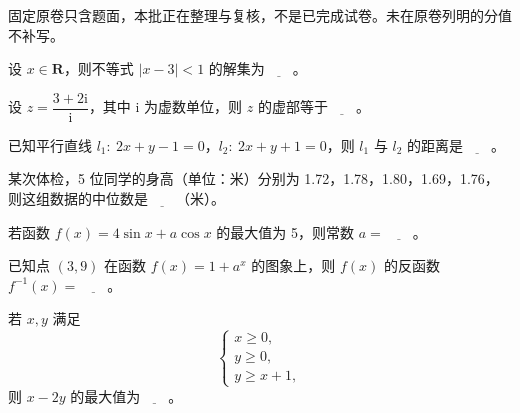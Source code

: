 

\begin{gktip}
固定原卷只含题面，本批正在整理与复核，不是已完成试卷。未在原卷列明的分值不补写。
\end{gktip}


\begin{question}
设 \(x\in\mathbf R\)，则不等式 \(|x-3|<1\) 的解集为\(\underline{\qquad}\)。

\end{question}
\begin{question}
设 \(z=\dfrac{3+2\mathrm i}{\mathrm i}\)，其中 \(\mathrm i\) 为虚数单位，则 \(z\) 的虚部等于\(\underline{\qquad}\)。

\end{question}
\begin{question}
已知平行直线 \(l_1:\ 2x+y-1=0\)，\(l_2:\ 2x+y+1=0\)，则 \(l_1\) 与 \(l_2\) 的距离是\(\underline{\qquad}\)。

\end{question}
\begin{question}
某次体检，5 位同学的身高（单位：米）分别为 1.72，1.78，1.80，1.69，1.76，则这组数据的中位数是\(\underline{\qquad}\)（米）。

\end{question}
\begin{question}
若函数 \(f(x)=4\sin x+a\cos x\) 的最大值为 5，则常数 \(a=\)\(\underline{\qquad}\)。

\end{question}
\begin{question}
已知点 \((3,9)\) 在函数 \(f(x)=1+a^x\) 的图象上，则 \(f(x)\) 的反函数 \(f^{-1}(x)=\)\(\underline{\qquad}\)。

\end{question}
\begin{question}
若 \(x,y\) 满足
\nopagebreak[4]
\[
\begin{cases}
x\geqslant0,\\
y\geqslant0,\\
y\geqslant x+1,
\end{cases}
\]
则 \(x-2y\) 的最大值为\(\underline{\qquad}\)。

\end{question}
